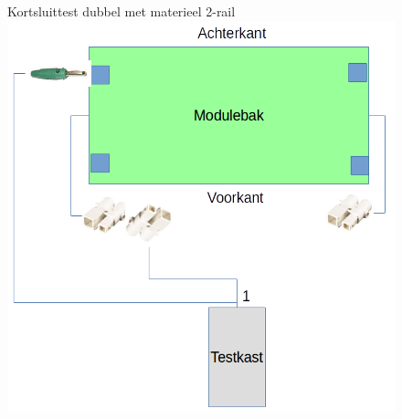 \documentclass[12pt,a4paper]{report}
\begin{document}
\begin{figure}[!ht]
  \captionbox
  {Kortsluittest dubbel met materieel 2-rail\label{im:test_dubbel_met_2rail}}
  {\includegraphics[scale=0.8]{images/rcu_test_dubbel_met_2rail}\\}
\end{figure}
\end{document}
